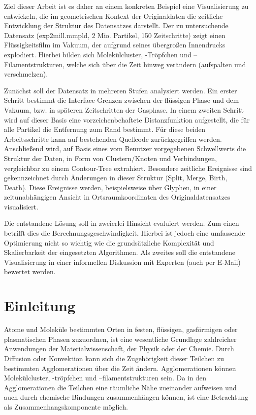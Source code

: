 Ziel dieser Arbeit ist es daher an einem konkreten Beispiel eine Visualisierung zu entwickeln, die im geometrischen Kontext der Originaldaten die zeitliche Entwicklung der Struktur des Datensatzes darstellt. Der zu untersuchende Datensatz (exp2mill.mmpld, 2 Mio. Partikel, 150 Zeitschritte) zeigt einen Flüssigkeitsfilm im Vakuum, der aufgrund seines übergroßen Innendrucks explodiert. Hierbei bilden sich Molekülcluster, -Tröpfchen und –Filamentstrukturen, welche sich über die Zeit hinweg verändern (aufspalten und verschmelzen).

Zunächst soll der Datensatz in mehreren Stufen analysiert werden. Ein erster Schritt bestimmt die Interface-Grenzen zwischen der flüssigen Phase und dem Vakuum, bzw. in späteren Zeitschritten der Gasphase. In einem zweiten Schritt wird auf dieser Basis eine vorzeichenbehaftete Distanzfunktion aufgestellt, die für alle Partikel die Entfernung zum Rand bestimmt. Für diese beiden Arbeitsschritte kann auf bestehenden Quellcode zurückgegriffen werden. Anschließend wird, auf Basis eines vom Benutzer vorgegebenen Schwellwerts die Struktur der Daten, in Form von Clustern/Knoten und Verbindungen, vergleichbar zu einem Contour-Tree extrahiert. Besondere zeitliche Ereignisse sind gekennzeichnet durch Änderungen in dieser Struktur (Split, Merge, Birth, Death). Diese Ereignisse werden, beispielsweise über Glyphen, in einer zeitunabhängigen Ansicht in Ortsraumkoordinaten des Originaldatensatzes visualisiert.

Die entstandene Lösung soll in zweierlei Hinsicht evaluiert werden. Zum einen betrifft dies die Berechnungsgeschwindigkeit. Hierbei ist jedoch eine umfassende Optimierung nicht so wichtig wie die grundsätzliche Komplexität und Skalierbarkeit der eingesetzten Algorithmen. Als zweites soll die entstandene Visualisierung in einer informellen Diskussion mit Experten (auch per E-Mail) bewertet werden.


\chapter{Einleitung}

Atome und Moleküle bestimmten Orten in festen, flüssigen, gasförmigen oder plasmatischen Phasen zuzuordnen, ist eine wesentliche Grundlage zahlreicher Anwendungen der Materialwissenschaft, der Physik oder der Chemie. %
Durch Diffusion oder Konvektion kann sich die Zugehörigkeit dieser Teilchen zu bestimmten Agglomerationen über die Zeit ändern. Agglomerationen können Molekülcluster, -tröpfchen und –filamentstrukturen sein. Da in den Agglomerationen die Teilchen eine räumliche Nähe zueinander aufweisen und auch durch chemische Bindungen zusammenhängen können, ist eine Betrachtung als Zusammenhangskomponente möglich.

